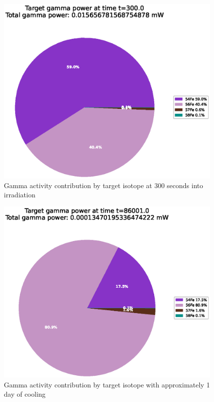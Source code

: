 \begin{figure}[!htb]
\centering
\includegraphics[width=0.8\linewidth]{chapters/activity_code/fe-activity-v2/target-energy/0100_300.eps}
\caption{Gamma activity contribution by target isotope at 300 seconds into irradiation}
\label{fig:activity-v2-target-power-300s}
\end{figure}

\begin{figure}[!htb]
\centering
\includegraphics[width=0.8\linewidth]{chapters/activity_code/fe-activity-v2/target-energy/0166_86001.eps}
\caption{Gamma activity contribution by target isotope with approximately 1 day of cooling}
\label{fig:activity-v2-target-power-86001s}
\end{figure}

